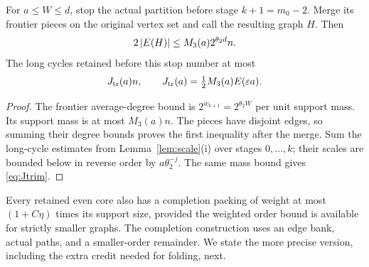 \begin{lemma}\label{lem:stopped}
For $a\le W\le d$, stop the actual partition before stage $k+1=m_0-2$.
Merge its frontier pieces on the original vertex set and call the resulting
graph $H$. Then
\[
     2\left|E(H)\right|\le M_3(a)2^{\theta_2d}n.
\]
The long cycles retained before this stop number at most
\begin{equation}\label{eq:Jtrim}
                   J_{\rm tr}(a)n,
       \qquad J_{\rm tr}(a)=\tfrac12M_3(a)E(\varepsilon a).
\end{equation}
\end{lemma}
\begin{proof}
The frontier average-degree bound is $2^{w_{k+1}}=2^{\theta_2W}$
per unit support mass. Its support mass is at most $M_3(a)n$.
The pieces have disjoint edges, so summing their degree bounds proves the
first inequality after the merge. Sum the long-cycle estimates from
Lemma~\ref{lem:scale}(i) over stages $0,\ldots,k$; their scales are bounded
below in reverse order by $a\theta_2^{-j}$. The same mass bound gives
\eqref{eq:Jtrim}.
\end{proof}

Every retained even core also has a completion packing of weight at most
$(1+C\eta)$ times its support size, provided the weighted order bound is
available for strictly smaller graphs. The completion construction uses
an edge bank, actual paths, and a smaller-order remainder. We state the
more precise version, including the extra credit needed for folding, next.
